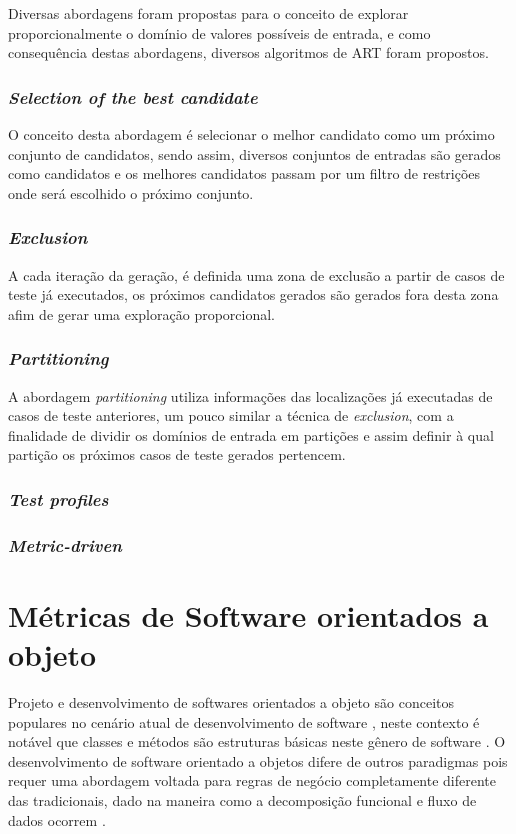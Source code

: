 \documentclass[
	12pt,				%
	oneside,			%
	a4paper,			%
	english,			%
	brazil				%
	]{abntex2ppgsi}
\begin{document}
Diversas abordagens foram propostas para o conceito de explorar proporcionalmente o domínio de valores possíveis de entrada, e como consequência destas abordagens, diversos algoritmos de ART foram propostos.

\subsection{\textit{Selection of the best candidate}}
O conceito desta abordagem é selecionar o melhor candidato como um próximo conjunto de candidatos, sendo assim, diversos conjuntos de entradas são gerados como candidatos e os melhores candidatos passam por um filtro de restrições onde será escolhido o próximo conjunto.

\subsection{\textit{Exclusion}}
A cada iteração da geração, é definida uma zona de exclusão a partir de casos de teste já executados, os próximos candidatos gerados são gerados fora desta zona afim de gerar uma exploração proporcional.

\subsection{\textit{Partitioning}}
A abordagem \textit{partitioning} utiliza informações das localizações já executadas de casos de teste anteriores, um pouco similar a técnica de \textit{exclusion}, com a finalidade de dividir os domínios de entrada em partições e assim definir à qual partição os próximos casos de teste gerados pertencem.

\subsection{\textit{Test profiles}}

\subsection{\textit{Metric-driven}}


\chapter{Métricas de Software orientados a objeto}

Projeto e desenvolvimento de softwares orientados a objeto são conceitos populares no cenário atual de desenvolvimento de software \cite{srivastava2013}, neste contexto é notável que classes e métodos são estruturas básicas neste gênero de software \cite{kan95}. O desenvolvimento de software orientado a objetos difere de outros paradigmas pois requer uma abordagem voltada para regras de negócio completamente diferente das tradicionais, dado na maneira como a decomposição funcional e fluxo de dados ocorrem  \cite{srivastava2013}.
\end{document}
